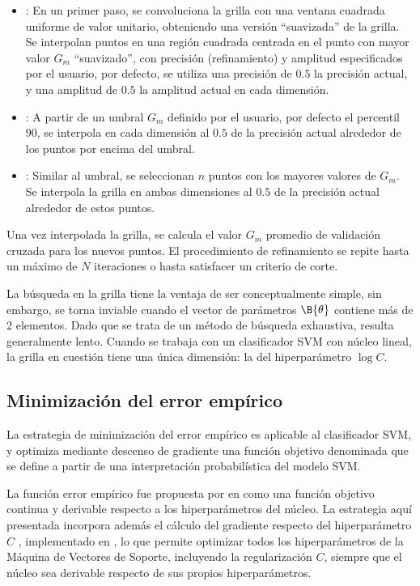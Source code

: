 \begin{itemize}
\item {}: En un primer paso, se convoluciona la grilla con una
  ventana cuadrada uniforme de valor unitario, obteniendo una versión
  ``suavizada'' de la grilla. Se interpolan puntos en una región
  cuadrada centrada en el punto con mayor valor $G_m$ ``suavizado'',
  con precisión (refinamiento) y amplitud especificados por el
  usuario, por defecto, se utiliza una precisión de $0.5$ la precisión
  actual, y una amplitud de $0.5$ la amplitud actual en cada
  dimensión.
\item {}: A partir de un umbral $G_m$ definido por el usuario,
  por defecto el percentil 90, se interpola en cada dimensión al $0.5$
  de la precisión actual alrededor de los puntos por encima del
  umbral.
\item {}: Similar al umbral, se seleccionan $n$ puntos
  con los mayores valores de $G_m$. Se interpola la grilla en ambas
  dimensiones al $0.5$ de la precisión actual alrededor de estos
  puntos.
\end{itemize}
Una vez interpolada la grilla, se calcula el valor $G_m$ promedio de
validación cruzada para los nuevos puntos. El procedimiento de
refinamiento se repite hasta un máximo de $N$ iteraciones o hasta
satisfacer un criterio de corte.

La búsqueda en la grilla tiene la ventaja de ser conceptualmente
simple, sin embargo, se torna inviable cuando el vector de parámetros
$\B{\theta}$ contiene más de 2 elementos. Dado que se trata de un
método de búsqueda exhaustiva, resulta generalmente lento.  Cuando se
trabaja con un clasificador SVM con núcleo lineal, la grilla en
cuestión tiene una única dimensión: la del hiperparámetro $\log C$.

\subsection{Minimización del error empírico}
La estrategia de minimización del error empírico es aplicable al
clasificador SVM, y optimiza mediante descenso de gradiente una
función objetivo denominada  que se define a partir
de una interpretación probabilística del modelo SVM.

La función error empírico fue propuesta por \citeauthor{ayat} en
\cite{ayat} como una función objetivo continua y derivable respecto a
los hiperparámetros del núcleo.  La estrategia aquí presentada
incorpora además el cálculo del gradiente respecto del hiperparámetro
$C$ \cite{keerthi, glasmachers}, implementado en \cite{shark}, lo que
permite optimizar todos los hiperparámetros de la Máquina de Vectores
de Soporte, incluyendo la regularización $C$, siempre que el núcleo
sea derivable respecto de sus propios hiperparámetros.

